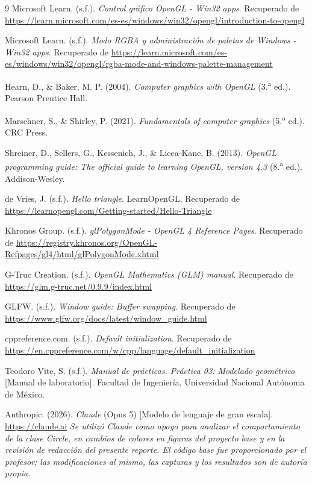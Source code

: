 \begin{thebibliography}{9}
  Microsoft Learn. (s.f.). \textit{Control gráfico OpenGL - Win32 apps}. Recuperado de \url{https://learn.microsoft.com/es-es/windows/win32/opengl/introduction-to-opengl}

Microsoft Learn. (s.f.). \textit{Modo RGBA y administración de paletas de Windows - Win32 apps}. Recuperado de \url{https://learn.microsoft.com/es-es/windows/win32/opengl/rgba-mode-and-windows-palette-management}

Hearn, D., \& Baker, M. P. (2004). \textit{Computer graphics with OpenGL} (3.\textsuperscript{a} ed.). Pearson Prentice Hall.

Marschner, S., \& Shirley, P. (2021). \textit{Fundamentals of computer graphics} (5.\textsuperscript{a} ed.). CRC Press.

Shreiner, D., Sellers, G., Kessenich, J., \& Licea-Kane, B. (2013). \textit{OpenGL programming guide: The official guide to learning OpenGL, version 4.3} (8.\textsuperscript{a} ed.). Addison-Wesley.

de Vries, J. (s.f.). \textit{Hello triangle}. LearnOpenGL. Recuperado de \url{https://learnopengl.com/Getting-started/Hello-Triangle}

Khronos Group. (s.f.). \textit{glPolygonMode - OpenGL 4 Reference Pages}. Recuperado de \url{https://registry.khronos.org/OpenGL-Refpages/gl4/html/glPolygonMode.xhtml}

G-Truc Creation. (s.f.). \textit{OpenGL Mathematics (GLM) manual}. Recuperado de \url{https://glm.g-truc.net/0.9.9/index.html}

GLFW. (s.f.). \textit{Window guide: Buffer swapping}. Recuperado de \url{https://www.glfw.org/docs/latest/window_guide.html}

cppreference.com. (s.f.). \textit{Default initialization}. Recuperado de \url{https://en.cppreference.com/w/cpp/language/default_initialization}

Teodoro Vite, S. (s.f.). \textit{Manual de prácticas. Práctica 03: Modelado geométrico} [Manual de laboratorio]. Facultad de Ingeniería, Universidad Nacional Autónoma de México.

Anthropic. (2026). \textit{Claude} (Opus 5) [Modelo de lenguaje de gran escala]. \url{https://claude.ai}
\textit{Se utilizó Claude como apoyo para analizar el comportamiento de la
clase Circle, en cambios de colores en figuras del proyecto base y en la revisión de redacción del presente
reporte. El código base fue proporcionado por el profesor; las modificaciones
al mismo, las capturas y los resultados son de autoría propia.}

\end{thebibliography}
